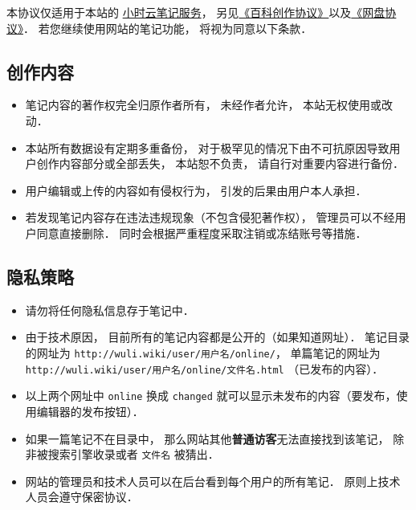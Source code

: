 
本协议仅适用于本站的 \href{http://wuli.wiki/note/}{小时云笔记服务}， 另见\href{http://wuli.wiki/online/licens.html}{《百科创作协议》}以及\href{http://www.example.com}{《网盘协议》}． 若您继续使用网站的笔记功能， 将视为同意以下条款．

\subsection{创作内容}
\begin{itemize}
\item 笔记内容的著作权完全归原作者所有， 未经作者允许， 本站无权使用或改动．
\item 本站所有数据设有定期多重备份， 对于极罕见的情况下由不可抗原因导致用户创作内容部分或全部丢失， 本站恕不负责， 请自行对重要内容进行备份．
\item 用户编辑或上传的内容如有侵权行为， 引发的后果由用户本人承担．
\item 若发现笔记内容存在违法违规现象（不包含侵犯著作权）， 管理员可以不经用户同意直接删除． 同时会根据严重程度采取注销或冻结账号等措施．
\end{itemize}

\subsection{隐私策略}
\begin{itemize}
\item 请勿将任何隐私信息存于笔记中．
\item 由于技术原因， 目前所有的笔记内容都是公开的（如果知道网址）． 笔记目录的网址为 \verb|http://wuli.wiki/user/用户名/online/|， 单篇笔记的网址为 \verb|http://wuli.wiki/user/用户名/online/文件名.html| （已发布的内容）．
\item 以上两个网址中 \verb|online| 换成 \verb|changed| 就可以显示未发布的内容（要发布，使用编辑器的发布按钮）．
\item 如果一篇笔记不在目录中， 那么网站其他\textbf{普通访客}无法直接找到该笔记， 除非被搜索引擎收录或者 \verb|文件名| 被猜出．
\item 网站的管理员和技术人员可以在后台看到每个用户的所有笔记． 原则上技术人员会遵守保密协议．
\end{itemize}
